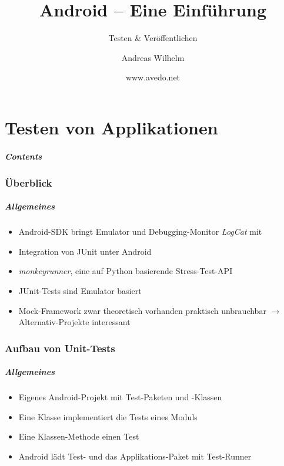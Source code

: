 \title{Android -- Eine Einführung}
\subtitle{Testen \& Veröffentlichen}
\author[A. Wilhelm]{Andreas Wilhelm}
\titlegraphic{}
\date{www.avedo.net}

\begin{frame}[plain]
  \titlepage
\end{frame}

\part{Testen von Applikationen}
\frame{\partpage}
\begin{frame}
	\frametitle{Contents}
	\tableofcontents[]
\end{frame}

\section{Überblick}
\begin{frame}
	\frametitle{Allgemeines}
	\begin{itemize}
		\item Android-SDK bringt Emulator und Debugging-Monitor \emph{LogCat} 
			mit
		\item Integration von JUnit unter Android
		\item \emph{monkeyrunner}, eine auf Python basierende Stress-Test-API
		\item JUnit-Tests sind Emulator basiert
		\item Mock-Framework zwar theoretisch vorhanden praktisch unbrauchbar
			$\rightarrow$ Alternativ-Projekte interessant
	\end{itemize}
\end{frame}

\section{Aufbau von Unit-Tests}
\begin{frame}
	\frametitle{Allgemeines}
	\begin{itemize}
		\item Eigenes Android-Projekt mit Test-Paketen und -Klassen
		\item Eine Klasse implementiert die Tests eines Moduls
		\item Eine Klassen-Methode einen Test
		\item Android lädt Test- und das Applikations-Paket mit Test-Runner
	\end{itemize}
\end{frame}

